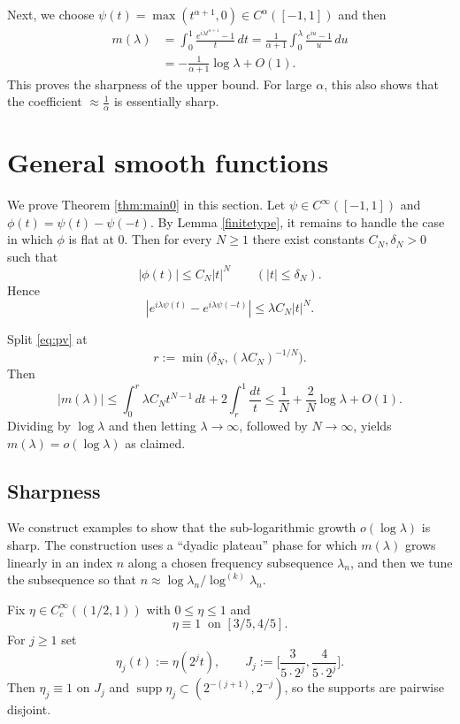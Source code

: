 \documentclass[11pt]{amsart}
\newcommand{\la}{\lambda}
\newcommand{\1}{{\rm 1\hspace*{-0.4ex}%
			\rule{0.1ex}{1.52ex}\hspace*{0.2ex}}}
\numberwithin{equation}{section}
\newcommand{\logit}[1]{\log^{(#1)}}
\begin{document}
Next, we choose $\psi(t)=\max(t^{\alpha+1},0)\in C^{\alpha}([-1,1])$ and then
\begin{align*}
	m(\lambda)
	&=
	\int_0^1 \frac{e^{i\lambda t^{\alpha+1}}-1}{t}\,dt=\frac1{\alpha+1}\int_0^\la\frac{e^{iu}-1}{u}\,du\\
	&=
	-\frac1{\alpha+1}\log\lambda + O(1).
\end{align*}
This proves the sharpness of the upper bound. For large $\alpha$, this also shows that the coefficient $\approx\frac1\alpha$ is essentially sharp.
	\section{General smooth functions}\label{sec3}
	We prove Theorem \ref{thm:main0} in this section. Let $\psi\in C^\infty([-1,1])$ and $\phi(t)=\psi(t)-\psi(-t)$. By Lemma \ref{finitetype}, it remains to handle the case in which $\phi$ is flat at $0$.
	Then for every $N\ge1$ there exist constants $C_N,\delta_N>0$ such that
	\[
	|\phi(t)|\le C_N |t|^N
	\qquad (|t|\le\delta_N).
	\]
	Hence
	\[
	|e^{i\lambda\psi(t)}-e^{i\lambda\psi(-t)}|
	\le \lambda C_N |t|^N.
	\]
	
	Split \eqref{eq:pv} at
	\[
	r:=\min\bigl(\delta_N,(\lambda C_N)^{-1/N}\bigr).
	\]
	Then
	\[
	|m(\lambda)|
	\le \int_0^r \lambda C_N t^{N-1}\,dt + 2\int_r^1 \frac{dt}{t}
	\le \frac1N + \frac{2}{N}\log\lambda + O(1).
	\]
	Dividing by $\log\lambda$ and then letting $\lambda\to\infty$, followed by $N\to\infty$, yields $m(\la)=o(\log\la)$ as claimed.



\subsection{Sharpness}
We construct examples to show that the sub-logarithmic growth $o(\log\la)$ is sharp. The construction uses a ``dyadic plateau'' phase for which $m(\lambda)$
grows linearly in an index $n$ along a chosen frequency subsequence
$\lambda_n$, and then we tune the subsequence so that
$n\approx \log\lambda_n/\logit{k}\lambda_n$.



Fix $\eta\in C_c^\infty((1/2,1))$ with $0\le \eta\le 1$ and
\[
\eta\equiv 1\ \text{ on } [3/5,4/5].
\]
For $j\ge 1$ set
\[
\eta_j(t):=\eta(2^j t),
\qquad
J_j:=\Big[\frac{3}{5\cdot 2^j},\frac{4}{5\cdot 2^j}\Big].
\]
Then $\eta_j\equiv 1$ on $J_j$ and $\operatorname{supp}\eta_j\subset(2^{-(j+1)},2^{-j})$,
so the supports are pairwise disjoint.
\end{document}
